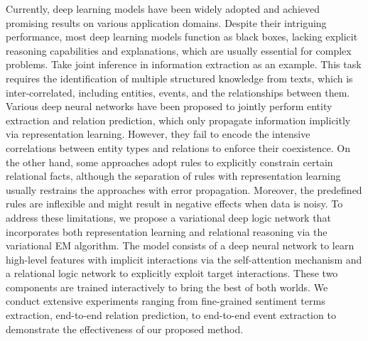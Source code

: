Currently, deep learning models have been widely adopted and achieved promising results on various application domains. Despite their intriguing performance, most deep learning models function as black boxes, lacking explicit reasoning capabilities and explanations, which are usually essential for complex problems. Take joint inference in information extraction as an example. This task requires the identification of multiple structured knowledge from texts, which is inter-correlated, including entities, events, and the relationships between them. Various deep neural networks have been proposed to jointly perform entity extraction and relation prediction, which only propagate information implicitly via representation learning. However, they fail to encode the intensive correlations between entity types and relations to enforce their coexistence. On the other hand, some approaches adopt rules to explicitly constrain certain relational facts, although the separation of rules with representation learning usually restrains the approaches with error propagation. Moreover, the predefined rules are inflexible and might result in negative effects when data is noisy. To address these limitations, we propose a variational deep logic network that incorporates both representation learning and relational reasoning via the variational EM algorithm. The model consists of a deep neural network to learn high-level features with implicit interactions via the self-attention mechanism and a relational logic network to explicitly exploit target interactions. These two components are trained interactively to bring the best of both worlds. We conduct extensive experiments ranging from fine-grained sentiment terms extraction, end-to-end relation prediction, to end-to-end event extraction to demonstrate the effectiveness of our proposed method.
